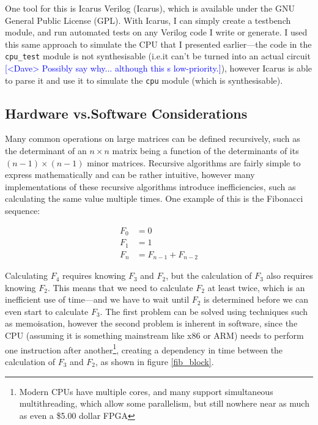 \documentclass[12pt]{article}
\newcommand{\note}[2][red]{\textcolor{#1}{#2}}
\newcommand{\notedme}[1]{\note[blue]{[<Dave> #1]}}
\begin{document}
One tool for this is Icarus Verilog (Icarus), which is available under the GNU General Public License (GPL). With Icarus, I can simply create a testbench module, and run automated tests on any Verilog code I write or generate. I used this same approach to simulate the CPU that I presented earlier---the code in the \lstinline[language=Verilog]|cpu_test| module is not synthesisable (i.e.\@ it can't be turned into an actual circuit \notedme{Possibly say why... although this s low-priority.}), however Icarus is able to parse it and use it to simulate the \lstinline[language=Verilog]|cpu| module (which is synthesisable).

\subsection{Hardware vs.\@ Software Considerations}

Many common operations on large matrices can be defined recursively, such as the determinant of an $n \times n$ matrix being a function of the determinants of its $(n-1) \times (n-1)$ minor matrices. Recursive algorithms are fairly simple to express mathematically and can be rather intuitive, however many implementations of these recursive algorithms introduce inefficiencies, such as calculating the same value multiple times. One example of this is the Fibonacci sequence:

\begin{align}
	F_0 &= 0 \\
	F_1 &= 1 \\
	F_n &= F_{n-1} + F_{n-2}
\end{align}

\noindent Calculating $F_4$ requires knowing $F_3$ and $F_2$, but the calculation of $F_3$ also requires knowing $F_2$. This means that we need to calculate $F_2$ at least twice, which is an inefficient use of time---and we have to wait until $F_2$ is determined before we can even start to calculate $F_3$. The first problem can be solved using techniques such as memoisation, however the second problem is inherent in software, since the CPU (assuming it is something mainstream like x86 or ARM) needs to perform one instruction after another\footnote{Modern CPUs have multiple cores, and many support simultaneous multithreading, which allow some parallelism, but still nowhere near as much as even a \$5.00 dollar FPGA}, creating a dependency in time between the calculation of $F_3$ and $F_2$, as shown in figure \ref{fib_block}.
\end{document}
